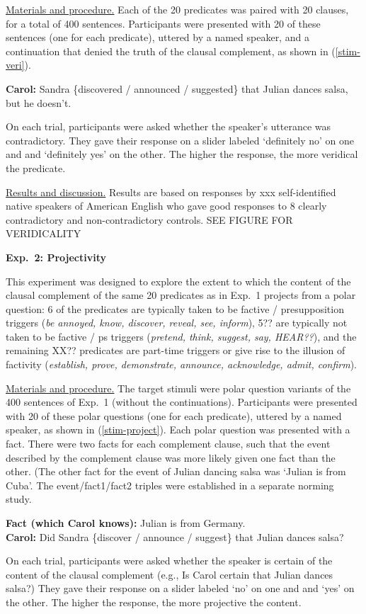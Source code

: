\documentclass[12pt]{article}
\newcommand{\6}{\mbox{$[\hspace*{-.6mm}[$}}
\newcommand{\9}{\mbox{$]\hspace*{-.6mm}]$}}
\begin{document}
\underline{Materials and procedure.} Each of the 20 predicates was paired with 20 clauses, for a total of 400 sentences. Participants were presented with 20 of these sentences (one for each predicate), uttered by a named speaker, and a continuation that denied the truth of the clausal complement, as shown in (\ref{stim-veri}).
\vspace*{-.2cm}
\begin{exe}
\ex\label{stim-veri} {\bf Carol:} Sandra \{discovered / announced / suggested\} that Julian dances salsa, but he doesn't. 
\end{exe}
\vspace*{-.2cm}
On each trial, participants were asked whether the speaker's utterance was contradictory. They gave their response on a slider labeled `definitely no' on one and and `definitely yes' on the other. The higher the response, the more veridical the predicate.

\underline{Results and discussion.} Results are based on responses by xxx self-identified native speakers of American English who gave good responses to 8 clearly contradictory and non-contradictory controls. SEE FIGURE FOR VERIDICALITY 

{\bf Exp.~2: Projectivity}

This experiment was designed to explore the extent to which the content of the clausal complement of the same 20 predicates as in Exp.~1 projects from a polar question: 6 of the predicates are typically taken to be factive / presupposition triggers ({\em be annoyed, know, discover, reveal, see, inform}), 5?? are typically not taken to be factive / ps triggers ({\em pretend, think, suggest, say, HEAR??}), and the remaining XX?? predicates are part-time triggers or give rise to the illusion of factivity ({\em establish, prove, demonstrate, announce, acknowledge, admit, confirm}).

\underline{Materials and procedure.} The target stimuli were polar question variants of the 400 sentences of Exp.~1 (without the continuations). Participants were presented with 20 of these polar questions (one for each predicate), uttered by a named speaker, as shown in (\ref{stim-project}). Each polar question was presented with a fact. There were two facts for each complement clause, such that the event described by the complement clause was more likely given one fact than the other. (The other fact for the event of Julian dancing salsa was `Julian is from Cuba'. The event/fact1/fact2 triples were established in a separate norming study.
\vspace*{-.2cm}
\begin{exe}
\ex\label{stim-project} {\bf Fact (which Carol knows):} Julian is from Germany.  \\ 
{\bf Carol:} Did Sandra \{discover / announce / suggest\} that Julian dances salsa?
\end{exe}
\vspace*{-.2cm}
On each trial, participants were asked whether the speaker is certain of the content of the clausal complement (e.g., Is Carol certain that Julian dances salsa?) They gave their response on a slider labeled `no' on one and and `yes' on the other. The higher the response, the more projective the content.
\end{document}
